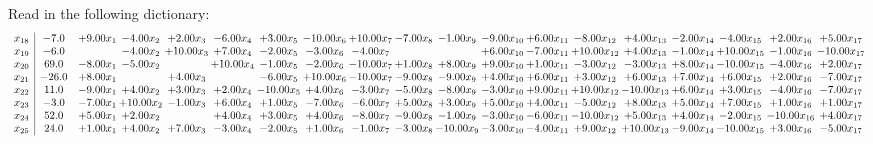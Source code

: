 \documentclass[9pt]{article}
\begin{document}
Read in the following dictionary:
\[\begin{array}{c| c c@{\hskip 2pt} c@{\hskip 2pt} c@{\hskip 2pt} c@{\hskip 2pt} c@{\hskip 2pt} c@{\hskip 2pt} c@{\hskip 2pt} c@{\hskip 2pt} c@{\hskip 2pt} c@{\hskip 2pt} c@{\hskip 2pt} c@{\hskip 2pt} c@{\hskip 2pt} c@{\hskip 2pt} c@{\hskip 2pt} c@{\hskip 2pt} c@{\hskip 2pt} }
 x_{18}   &  -7.0 & +  9.00 x_{1} & -4.00 x_{2} & +  2.00 x_{3} & -6.00 x_{4} & +  3.00 x_{5} & -10.00 x_{6} & + 10.00 x_{7} & -7.00 x_{8} & -1.00 x_{9} & -9.00 x_{10} & +  6.00 x_{11} & -8.00 x_{12} & +  4.00 x_{13} & -2.00 x_{14} & -4.00 x_{15} & +  2.00 x_{16} & +  5.00 x_{17}\\
 x_{19}   &  -6.0  &   & -4.00 x_{2} & + 10.00 x_{3} & +  7.00 x_{4} & -2.00 x_{5} & -3.00 x_{6} & -4.00 x_{7} &    &   & +  6.00 x_{10} & -7.00 x_{11} & + 10.00 x_{12} & +  4.00 x_{13} & -1.00 x_{14} & + 10.00 x_{15} & -1.00 x_{16} & -10.00 x_{17}\\
 x_{20}   &  69.0 & -8.00 x_{1} & -5.00 x_{2} &   & + 10.00 x_{4} & -1.00 x_{5} & -2.00 x_{6} & -10.00 x_{7} & +  1.00 x_{8} & +  8.00 x_{9} & +  9.00 x_{10} & +  1.00 x_{11} & -3.00 x_{12} & -3.00 x_{13} & +  8.00 x_{14} & -10.00 x_{15} & -4.00 x_{16} & +  2.00 x_{17}\\
 x_{21}   &  -26.0 & +  8.00 x_{1} &   & +  4.00 x_{3} &   & -6.00 x_{5} & + 10.00 x_{6} & -10.00 x_{7} & -9.00 x_{8} & -9.00 x_{9} & +  4.00 x_{10} & +  6.00 x_{11} & +  3.00 x_{12} & +  6.00 x_{13} & +  7.00 x_{14} & +  6.00 x_{15} & +  2.00 x_{16} & -7.00 x_{17}\\
 x_{22}   &  11.0 & -9.00 x_{1} & +  4.00 x_{2} & +  3.00 x_{3} & +  2.00 x_{4} & -10.00 x_{5} & +  4.00 x_{6} & -3.00 x_{7} & -5.00 x_{8} & -8.00 x_{9} & -3.00 x_{10} & +  9.00 x_{11} & + 10.00 x_{12} & -10.00 x_{13} & +  6.00 x_{14} & +  3.00 x_{15} & -4.00 x_{16} & -7.00 x_{17}\\
 x_{23}   &  -3.0 & -7.00 x_{1} & + 10.00 x_{2} & -1.00 x_{3} & +  6.00 x_{4} & +  1.00 x_{5} & -7.00 x_{6} & -6.00 x_{7} & +  5.00 x_{8} & +  3.00 x_{9} & +  5.00 x_{10} & +  4.00 x_{11} & -5.00 x_{12} & +  8.00 x_{13} & +  5.00 x_{14} & +  7.00 x_{15} & +  1.00 x_{16} & +  1.00 x_{17}\\
 x_{24}   &  52.0 & +  5.00 x_{1} & +  2.00 x_{2} &   & +  4.00 x_{4} & +  3.00 x_{5} & +  4.00 x_{6} & -8.00 x_{7} & -9.00 x_{8} & -1.00 x_{9} & -3.00 x_{10} & -6.00 x_{11} & -10.00 x_{12} & +  5.00 x_{13} & +  4.00 x_{14} & -2.00 x_{15} & -10.00 x_{16} & +  4.00 x_{17}\\
 x_{25}   &  24.0 & +  1.00 x_{1} & +  4.00 x_{2} & +  7.00 x_{3} & -3.00 x_{4} & -2.00 x_{5} & +  1.00 x_{6} & -1.00 x_{7} & -3.00 x_{8} & -10.00 x_{9} & -3.00 x_{10} & -4.00 x_{11} & +  9.00 x_{12} & + 10.00 x_{13} & -9.00 x_{14} & -10.00 x_{15} & +  3.00 x_{16} & -5.00 x_{17}\\

\end{array}\]
\end{document}
